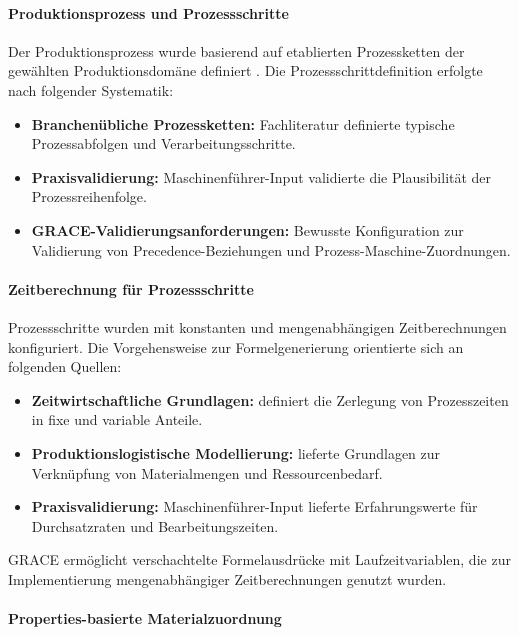 \paragraph{Produktionsprozess und Prozessschritte}

Der Produktionsprozess wurde basierend auf etablierten Prozessketten der gewählten Produktionsdomäne definiert \citep{goldschmidt:lackproduktion2019, vci:lacke_farben2018}. Die Prozessschrittdefinition erfolgte nach folgender Systematik:

\begin{itemize}
    \item \textbf{Branchenübliche Prozessketten:} Fachliteratur definierte typische Prozessabfolgen und Verarbeitungsschritte.
    \item \textbf{Praxisvalidierung:} Maschinenführer-Input validierte die Plausibilität der Prozessreihenfolge.
    \item \textbf{GRACE-Validierungsanforderungen:} Bewusste Konfiguration zur Validierung von Precedence-Beziehungen und Prozess-Maschine-Zuordnungen.
\end{itemize}

\paragraph{Zeitberechnung für Prozessschritte}

Prozessschritte wurden mit konstanten und mengenabhängigen Zeitberechnungen konfiguriert. Die Vorgehensweise zur Formelgenerierung orientierte sich an folgenden Quellen:

\begin{itemize}
    \item \textbf{Zeitwirtschaftliche Grundlagen:} \cite{REFA2012} definiert die Zerlegung von Prozesszeiten in fixe und variable Anteile.
    \item \textbf{Produktionslogistische Modellierung:} \cite{guenther:produktion2020} lieferte Grundlagen zur Verknüpfung von Materialmengen und Ressourcenbedarf.
    \item \textbf{Praxisvalidierung:} Maschinenführer-Input lieferte Erfahrungswerte für Durchsatzraten und Bearbeitungszeiten.
\end{itemize}

GRACE ermöglicht verschachtelte Formelausdrücke mit Laufzeitvariablen, die zur Implementierung mengenabhängiger Zeitberechnungen genutzt wurden.

\paragraph{Properties-basierte Materialzuordnung}

